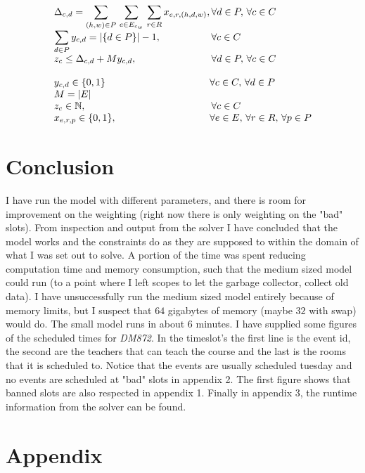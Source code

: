 \documentclass{article}
\begin{document}
\begin{equation*}
\begin{array}{ll@{}ll}
            & \displaystyle \Delta_{c,d} =  \sum_{(h,w) \in P} \, \sum_{e \in E_{c_w}} \,\sum_{r \in R}  x_{e,r,(h,d,w)}, & \, \forall d \in P, \, \forall c \in C\\
            & \displaystyle \sum_{d \in P} y_{c,d} = |\{d \in P\}| - 1 , & \, \forall c \in C\\
            & \displaystyle z_c \leq \Delta_{c,d} + M y_{c,d} , & \, \forall d \in P , \, \forall c \in C\\
            & &\\
            & y_{c,d} \in \{0, 1\} & \forall c \in C, \, \forall d \in P \\
            & M = |E| &\\
            & z_c \in \mathbb{N}, & \, \forall c \in C\\
            & x_{e,r,p} \in \{0,1\},&  \forall e \in E ,\, \forall r \in R ,\, \forall p \in P &
        \end{array}
    \end{equation*}

    \section{Conclusion}
    I have run the model with different parameters, and there is room for improvement on the weighting (right now there is only weighting on the "bad" slots).
    From inspection and output from the solver I have concluded that the model works and the constraints do as they are supposed to within the domain of what I was set out to solve.
    A portion of the time was spent reducing computation time and memory consumption, such that the medium sized model could run (to a point where I left scopes to let the garbage collector, collect old data).
    I have unsuccessfully run the medium sized model entirely because of memory limits, but I suspect that $64$ gigabytes of memory (maybe $32$ with swap) would do.
    The small model runs in about $6$ minutes.
    I have supplied some figures of the scheduled times for \textit{DM872}.
    In the timeslot's the first line is the event id, the second are the teachers that can teach the course and the last is the rooms that it is scheduled to.
    Notice that the events are usually scheduled tuesday and no events are scheduled at "bad" slots in appendix 2.
    The first figure shows that banned slots are also respected in appendix 1.
    Finally in appendix 3, the runtime information from the solver can be found.

    \clearpage
    \section{Appendix}
\end{document}
